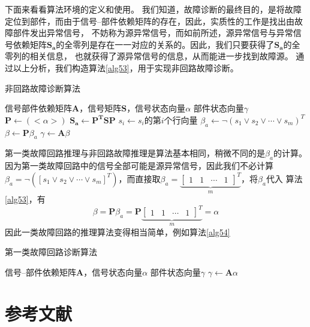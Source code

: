 下面来看看算法环境的定义和使用。
我们知道，故障诊断的最终目的，是将故障定位到部件，而由于信号--部件依赖矩阵的存在，因此，实质性的工作是找出由故障部件发出异常信号，
不妨称为源异常信号，而如前所述，源异常信号与异常信号依赖矩阵$\mathbf{S_a}$的全零列是存在一一对应的关系的。因此，我们只要获得了$\mathbf{S_a}$的全零列的相关信息，
也就获得了源异常信号的信息，从而能进一步找到故障源。
通过以上分析，我们构造算法\ref{alg53}，用于实现非回路故障诊断。
\begin{algorithm}[htbp]
  \caption{非回路故障诊断算法}
  \label{alg53}
  \begin{algorithmic}[1]
    \REQUIRE 信号部件依赖矩阵$\mathbf{A}$，信号矩阵$\mathbf{S}$，信号状态向量$\alpha$
    \ENSURE 部件状态向量$\gamma$
    \STATE $\mathbf{P}\leftarrow\left(<\alpha>\right)$
    \STATE $\mathbf{S_{a}}\leftarrow\mathbf{P^T}\mathbf{S}\mathbf{P}$
    \STATE $s_i\leftarrow s_i$的第$i$个行向量
    \ENDFOR
    \STATE $\beta_a\leftarrow\lnot \left(s_1\lor s_2\lor \cdots\lor s_m\right)^T$
    \STATE $\beta\leftarrow\mathbf{P}\beta_a$
    \STATE $\gamma\leftarrow\mathbf{A}\beta$
  \end{algorithmic}
\end{algorithm}

第一类故障回路推理与非回路故障推理是算法基本相同，稍微不同的是$\beta_a$的计算。因为第一类故障回路中的信号全部可能是源异常信号，因此我们不必计算
$\beta_a=\lnot \left(\left[s_1\lor s_2\lor \cdots\lor s_m\right]^T\right)$，而直接取$\beta_a=\underbrace{\left[\begin{array}{cccc}1&1&\cdots&1\end{array}\right]^T}_m$，将$\beta_a$代入
算法\ref{alg53}，有
\[\beta=\mathbf{P}\beta_a=\mathbf{P}\underbrace{\left[\begin{array}{cccc}1&1&\cdots&1\end{array}\right]^T}_m=\alpha\]
因此一类故障回路的推理算法变得相当简单，例如算法\ref{alg54}
\begin{algorithm}[htbp]
  \caption{第一类故障回路诊断算法}
  \label{alg54}
  \begin{algorithmic}[1]
    \REQUIRE 信号--部件依赖矩阵$\mathbf{A}$，信号状态向量$\alpha$
    \ENSURE 部件状态向量$\gamma$
    \STATE $\gamma\leftarrow\mathbf{A}\alpha$
  \end{algorithmic}
\end{algorithm}

\section{参考文献}
\label{sec:bib}

